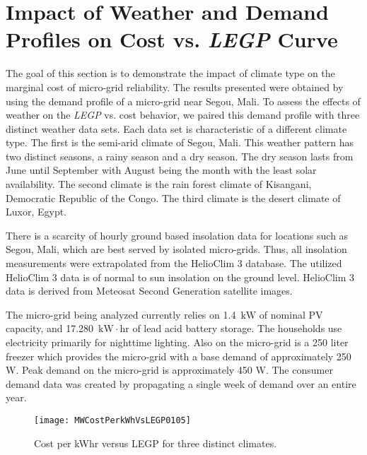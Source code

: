 \documentclass{article}
\newcommand{\unit}[1]{\ensuremath{\, \mathrm{#1}}}
\begin{document}
\section{Impact of Weather and Demand Profiles on Cost vs. \emph{LEGP} Curve}

The goal of this section is to demonstrate the impact of climate type on the marginal cost of micro-grid reliability.
The results presented were obtained by using the demand profile of a micro-grid near Segou, Mali. 
To assess the effects of weather on the \emph{LEGP} vs. cost behavior, we paired this demand profile with three distinct weather data sets. 
Each data set is characteristic of a different climate type. 
The first is the semi-arid climate of Segou, Mali. This weather pattern has two distinct seasons, a rainy season and a dry season.
The dry season lasts from June until September with August being the month with the least solar availability. %
The second climate is the rain forest climate of Kisangani, Democratic Republic of the Congo. %
The third climate is the desert climate of Luxor, Egypt. %

There is a scarcity of hourly ground based insolation data for locations such as Segou, Mali, which are best served by isolated micro-grids. 
Thus, all insolation measurements were extrapolated from the HelioClim 3 database. The utilized HelioClim 3 data is of normal to sun insolation on the ground level.
HelioClim 3 data is derived from Meteosat Second Generation satellite images. 

The micro-grid being analyzed currently relies on 1.4 \unit{kW} of nominal PV capacity, and 17.280 \unit{kW\cdot hr} of lead acid battery storage.
The households use electricity primarily for nighttime lighting.
Also on the micro-grid is a 250 liter freezer which provides the micro-grid with a base demand of approximately 250 W. 
Peak demand on the micro-grid is approximately 450 W. 
The consumer demand data was created by propagating a single week of demand over an entire year.

\begin{figure}[ht]
\centering
\texttt{[image: MWCostPerkWhVsLEGP0105]}
\caption{Cost per kWhr versus LEGP for three distinct climates.}
\label{MWCostperkWhrLEGP}
\end{figure} 
\end{document}
